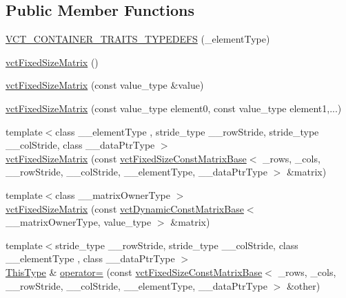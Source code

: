 \subsection*{Public Member Functions}
\begin{DoxyCompactItemize}
\item 
\hyperlink{classvct_fixed_size_matrix_a78c5d283ff740706b19aa20a26f2aa72}{V\+C\+T\+\_\+\+C\+O\+N\+T\+A\+I\+N\+E\+R\+\_\+\+T\+R\+A\+I\+T\+S\+\_\+\+T\+Y\+P\+E\+D\+E\+F\+S} (\+\_\+element\+Type)
\item 
\hyperlink{classvct_fixed_size_matrix_a8e739eb559d9d6e89327760d4d730dc6}{vct\+Fixed\+Size\+Matrix} ()
\item 
\hyperlink{classvct_fixed_size_matrix_ab1a36da72bbaa940a6ecb8b5948cefd5}{vct\+Fixed\+Size\+Matrix} (const value\+\_\+type \&value)
\item 
\hyperlink{classvct_fixed_size_matrix_adb59d89c0f4e11f97357682f5063457b}{vct\+Fixed\+Size\+Matrix} (const value\+\_\+type element0, const value\+\_\+type element1,...)
\item 
{\footnotesize template$<$class \+\_\+\+\_\+element\+Type , stride\+\_\+type \+\_\+\+\_\+row\+Stride, stride\+\_\+type \+\_\+\+\_\+col\+Stride, class \+\_\+\+\_\+data\+Ptr\+Type $>$ }\\\hyperlink{classvct_fixed_size_matrix_a98b4158359ed5e4cb02c41a19b0c39a1}{vct\+Fixed\+Size\+Matrix} (const \hyperlink{classvct_fixed_size_const_matrix_base}{vct\+Fixed\+Size\+Const\+Matrix\+Base}$<$ \+\_\+rows, \+\_\+cols, \+\_\+\+\_\+row\+Stride, \+\_\+\+\_\+col\+Stride, \+\_\+\+\_\+element\+Type, \+\_\+\+\_\+data\+Ptr\+Type $>$ \&matrix)
\item 
{\footnotesize template$<$class \+\_\+\+\_\+matrix\+Owner\+Type $>$ }\\\hyperlink{classvct_fixed_size_matrix_a4dcca7d8dfa0b09c2421c3a8929446c1}{vct\+Fixed\+Size\+Matrix} (const \hyperlink{classvct_dynamic_const_matrix_base}{vct\+Dynamic\+Const\+Matrix\+Base}$<$ \+\_\+\+\_\+matrix\+Owner\+Type, value\+\_\+type $>$ \&matrix)
\item 
{\footnotesize template$<$stride\+\_\+type \+\_\+\+\_\+row\+Stride, stride\+\_\+type \+\_\+\+\_\+col\+Stride, class \+\_\+\+\_\+element\+Type , class \+\_\+\+\_\+data\+Ptr\+Type $>$ }\\\hyperlink{classvct_fixed_size_const_matrix_base_a7ec66a96ed7e08ce9ff54093133c9d8d}{This\+Type} \& \hyperlink{classvct_fixed_size_matrix_af89b7386592f2db08c889328a8c97b1b}{operator=} (const \hyperlink{classvct_fixed_size_const_matrix_base}{vct\+Fixed\+Size\+Const\+Matrix\+Base}$<$ \+\_\+rows, \+\_\+cols, \+\_\+\+\_\+row\+Stride, \+\_\+\+\_\+col\+Stride, \+\_\+\+\_\+element\+Type, \+\_\+\+\_\+data\+Ptr\+Type $>$ \&other)

\end{DoxyCompactItemize}
